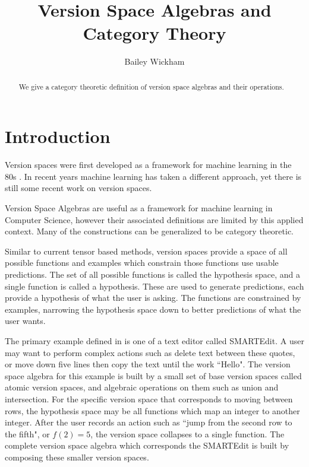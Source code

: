 \documentclass{article}
\title{Version Space Algebras and Category Theory}
\author{Bailey Wickham}
\theoremstyle{definition}
\begin{document}
\maketitle

\begin{abstract}
We give a category theoretic definition of version space algebras and their operations. 
\end{abstract}

\section{Introduction}
Version spaces were first developed as a framework for machine learning in the 80s \cite{original}. In recent years machine learning has taken a different approach, yet there is still some recent work on version spaces.

Version Space Algebras are useful as a framework for machine learning in Computer Science, however their associated definitions are limited by this applied context. Many of the constructions can be generalized to be category theoretic. 

Similar to current tensor based methods, version spaces provide a space of all possible functions and examples which constrain those functions use usable predictions. The set of all possible functions is called the hypothesis space, and a single function is called a hypothesis. These are used to generate predictions, each provide a hypothesis of what the user is asking. The functions are constrained by examples, narrowing the hypothesis space down to better predictions of what the user wants.

The primary example defined in \cite{short} is one of a text editor called SMARTEdit. A user may want to perform complex actions such as delete text between these quotes, or move down five lines then copy the text until the work ``Hello". The version space algebra for this example is built by a small set of base version spaces called atomic version spaces, and algebraic operations on them such as union and intersection. For the specific version space that corresponds to moving between rows, the hypothesis space may be all functions which map an integer to another integer. After the user records an action such as ``jump from the second row to the fifth", or $f(2) = 5$, the version space collapses to a single function. The complete version space algebra which corresponds the SMARTEdit is built by composing these smaller version spaces.
\end{document}
